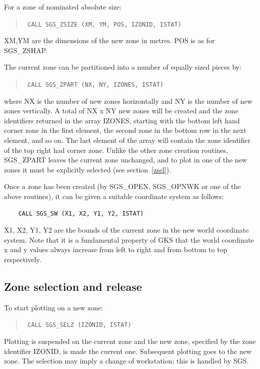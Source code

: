 \documentclass[11pt]{article}
\newcommand{\hyperref}[4]{#2\ref{#4}#3}
\newcommand{\htmlref}[2]{#1}
\begin{document}
For a zone of nominated absolute size:
\begin{quote}{\tt
    CALL \htmlref{SGS\_ZSIZE}{SGS_ZSIZE} (XM, YM, POS, IZONID, ISTAT)}
\end{quote}
XM,YM are the dimensions of the new zone in metres.  POS is as for
SGS\_ZSHAP.

The current zone can be partitioned into a number of equally sized pieces
by:
\begin{quote}{\tt
    CALL \htmlref{SGS\_ZPART}{SGS_ZPART} (NX, NY, IZONES, ISTAT)}
\end{quote}
where NX is the number of new zones horizontally and NY is the number of new
zones vertically.  A total of NX x NY new zones will be created and the zone
identifiers
returned in the array IZONES, starting with the bottom left hand corner zone in
the first element, the second zone in the bottom row in the next element, and
so on.  The last element of the array will contain the zone
identifier of the top right
had corner zone.  Unlike the other zone creation routines, SGS\_ZPART leaves the
current zone unchanged, and to plot in one of the new zones it must be
explicitly selected (see \hyperref{this section}{section~}{}{zsel}).

Once a zone has been created (by SGS\_OPEN, SGS\_OPNWK or one of the
above routines), it can be given a suitable coordinate
system as follows:
\begin{verbatim}
    CALL SGS_SW (X1, X2, Y1, Y2, ISTAT)
\end{verbatim}
X1, X2, Y1, Y2 are the bounds of the current zone in the new
world coordinate system.  Note that it is a fundamental property of GKS that
the world coordinate x and y values always increase from left to right and
from bottom to top respectively.

\subsection {\label{zsel}Zone selection and release}

To start plotting on a new \htmlref{zone}{zones}:
\begin{quote}{\tt
    CALL \htmlref{SGS\_SELZ}{SGS_SELZ} (IZONID, ISTAT)}
\end{quote}
Plotting is suspended on the current zone and the new
zone, specified by the zone identifier IZONID, is made
the current one.  Subsequent plotting goes to the new
zone.  The selection may imply a change of workstation;  this is
handled by SGS.
\end{document}
